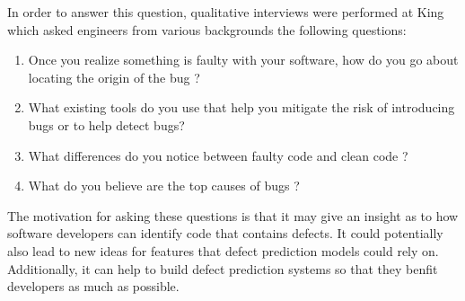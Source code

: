 \documentclass[../main.tex]{subfiles}
\begin{document}
In order to answer this question, qualitative interviews were performed at King which asked engineers from various backgrounds the following questions:

\begin{enumerate}
    \item Once you realize something is faulty with your software, how do you go about locating the origin of the bug ?
    \item What existing tools do you use that help you mitigate the risk of introducing bugs or to help detect bugs?
    \item What differences do you notice between faulty code and clean code ?
    \item What do you believe are the top causes of bugs ? 
\end{enumerate}

The motivation for asking these questions is that it may give an insight as to how software developers can identify code that contains defects. It could potentially also lead to new ideas for features that defect prediction models could rely on. Additionally, it can help to build defect prediction systems so that they benfit developers as much as possible. 
\end{document}
